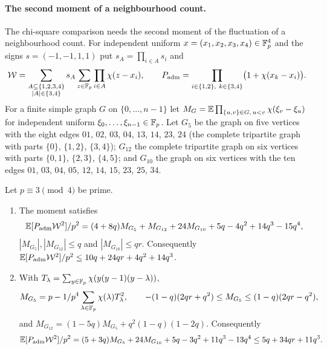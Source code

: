 \paragraph{The second moment of a neighbourhood count.}
The chi-square comparison needs the second moment of the fluctuation of a
neighbourhood count. For independent uniform $x=(x_1,x_2,x_3,x_4)\in\mathbb F_p^4$ and
the signs $s=(-1,-1,1,1)$ put $s_A=\prod_{i\in A}s_i$ and
\[
 \mathcal W=\sum_{\substack{A\subseteq\{1,2,3,4\}\\|A|\in\{3,4\}}}s_A
 \sum_{z\in\Fp}\prod_{i\in A}\chi(z-x_i),\qquad
 P_{\rm adm}=\prod_{i\in\{1,2\},\ k\in\{3,4\}}\bigl(1+\chi(x_k-x_i)\bigr).
\]
For a finite simple graph $G$ on $\{0,\dots,n-1\}$ let
$M_G=\mathbb E\prod_{\{u,v\}\in G,\,u<v}\chi(\xi_v-\xi_u)$ for independent uniform
$\xi_0,\dots,\xi_{n-1}\in\mathbb F_p$. Let $G_5$ be the graph on five vertices with the
eight edges $01$, $02$, $03$, $04$, $13$, $14$, $23$, $24$ (the complete
tripartite graph with parts $\{0\}$, $\{1,2\}$, $\{3,4\}$); $G_{12}$ the complete
tripartite graph on six vertices with parts $\{0,1\}$, $\{2,3\}$, $\{4,5\}$; and
$G_{10}$ the graph on six vertices with the ten edges $01$, $03$, $04$, $05$,
$12$, $14$, $15$, $23$, $25$, $34$.

\begin{lemma}
\label{lem:record:weighted-moment}
Let $p\equiv3\pmod4$ be prime.
\begin{enumerate}[label=(\alph*)]
\item The moment satisfies
 \begin{equation}\label{eq:record:weighted-identity}
  \mathbb E[P_{\rm adm}\mathcal W^2]/p^2=(4+8q)M_{G_5}+M_{G_{12}}+24M_{G_{10}}
  +5q-4q^2+14q^3-15q^4,
 \end{equation}
 $|M_{G_5}|,|M_{G_{12}}|\le q$ and $|M_{G_{10}}|\le qr$. Consequently
 $\mathbb E[P_{\rm adm}\mathcal W^2]/p^2\le10q+24qr+4q^2+14q^3$.
\item With $T_\lambda=\sum_{y\in\mathbb F_p}\chi(y(y-1)(y-\lambda))$,
 \begin{equation}\label{eq:record:modular-moment}
  M_{G_5}=p-1/p^4\sum_{\lambda\in\mathbb F_p}\chi(\lambda)T_\lambda^2,\qquad
  -(1-q)(2qr+q^2)\le M_{G_5}\le(1-q)(2qr-q^2),
 \end{equation}
 and $M_{G_{12}}=(1-5q)M_{G_5}+q^2(1-q)(1-2q)$. Consequently
 \[
  \mathbb E[P_{\rm adm}\mathcal W^2]/p^2=(5+3q)M_{G_5}+24M_{G_{10}}+5q-3q^2
  +11q^3-13q^4\le5q+34qr+11q^3 .
 \]
\end{enumerate}
\end{lemma}

